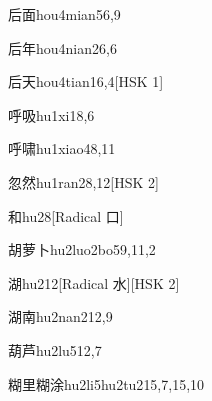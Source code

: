 \begin{entry}{后面}{hou4mian5}{6,9}
\end{entry}

\begin{entry}{后年}{hou4nian2}{6,6}
\end{entry}

\begin{entry}{后天}{hou4tian1}{6,4}[HSK 1]
\end{entry}

\begin{entry}{呼吸}{hu1xi1}{8,6}
\end{entry}

\begin{entry}{呼啸}{hu1xiao4}{8,11}
\end{entry}

\begin{entry}{忽然}{hu1ran2}{8,12}[HSK 2]
\end{entry}

\begin{entry}{和}{hu2}{8}[Radical 口]
\end{entry}

\begin{entry}{胡萝卜}{hu2luo2bo5}{9,11,2}
\end{entry}

\begin{entry}{湖}{hu2}{12}[Radical 水][HSK 2]
\end{entry}

\begin{entry}{湖南}{hu2nan2}{12,9}
\end{entry}

\begin{entry}{葫芦}{hu2lu5}{12,7}
\end{entry}

\begin{entry}{糊里糊涂}{hu2li5hu2tu2}{15,7,15,10}
\end{entry}


